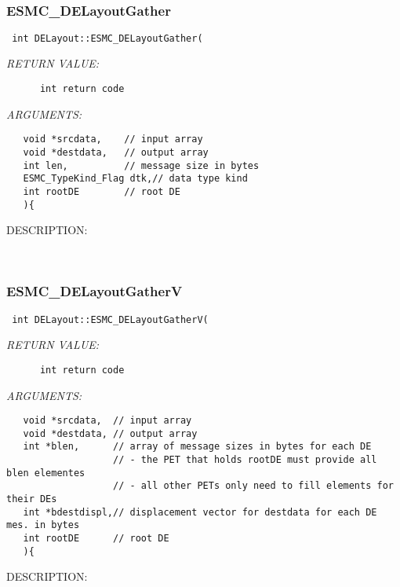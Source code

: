    
 
\mbox{}\hrulefill\
 
\subsubsection [ESMC\_DELayoutGather] {ESMC\_DELayoutGather}


  
\begin{verbatim} int DELayout::ESMC_DELayoutGather(\end{verbatim}{\em RETURN VALUE:}
\begin{verbatim}      int return code\end{verbatim}{\em ARGUMENTS:}
\begin{verbatim}   void *srcdata,    // input array
   void *destdata,   // output array
   int len,          // message size in bytes
   ESMC_TypeKind_Flag dtk,// data type kind
   int rootDE        // root DE
   ){\end{verbatim}
{\sf DESCRIPTION:\\ }


   
 
\mbox{}\hrulefill\
 
\subsubsection [ESMC\_DELayoutGatherV] {ESMC\_DELayoutGatherV}


  
\begin{verbatim} int DELayout::ESMC_DELayoutGatherV(\end{verbatim}{\em RETURN VALUE:}
\begin{verbatim}      int return code\end{verbatim}{\em ARGUMENTS:}
\begin{verbatim}   void *srcdata,  // input array
   void *destdata, // output array
   int *blen,      // array of message sizes in bytes for each DE
                   // - the PET that holds rootDE must provide all blen elementes
                   // - all other PETs only need to fill elements for their DEs
   int *bdestdispl,// displacement vector for destdata for each DE mes. in bytes
   int rootDE      // root DE
   ){\end{verbatim}
{\sf DESCRIPTION:\\ }


